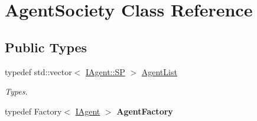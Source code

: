 \hypertarget{class_agent_society}{}\section{Agent\+Society Class Reference}
\label{class_agent_society}
\subsection*{Public Types}
\begin{DoxyCompactItemize}
\item 
\mbox{\label{class_agent_society_a97390fc3b2f25357b0b771ccaa919f8c}} 
typedef std\+::vector$<$ \hyperlink{class_i_agent_a9e88f0528d282c33200a2d43d1c29a73}{I\+Agent\+::\+SP} $>$ \hyperlink{class_agent_society_a97390fc3b2f25357b0b771ccaa919f8c}{Agent\+List}
\begin{DoxyCompactList}\small\item\em Types. \end{DoxyCompactList}\item 
\mbox{\label{class_agent_society_ae02963e0f837bc38c1ab44ff44218d91}} 
typedef Factory$<$ \hyperlink{class_i_agent}{I\+Agent} $>$ {\bfseries Agent\+Factory}
\end{DoxyCompactItemize}
